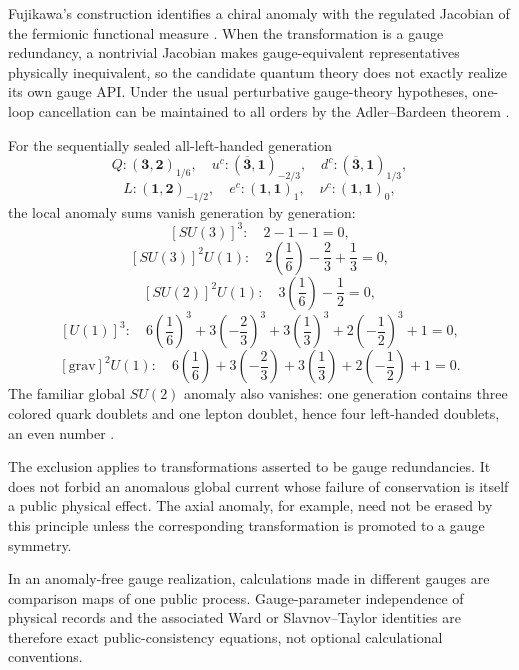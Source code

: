 \begin{proofsketch}
Fujikawa's construction identifies a chiral anomaly with the regulated Jacobian of
the fermionic functional measure \cite{fujikawa-measure}.  When the transformation
is a gauge redundancy, a nontrivial Jacobian makes gauge-equivalent representatives
physically inequivalent, so the candidate quantum theory does not exactly realize
its own gauge API.  Under the usual perturbative gauge-theory hypotheses, one-loop
cancellation can be maintained to all orders by the Adler--Bardeen theorem
\cite{adler-bardeen-anomaly}.
\end{proofsketch}

\begin{proposition}
\label{prop:sm-anomaly-checksum-ledger}
For the sequentially sealed all-left-handed generation
\[
 Q:(\mathbf3,\mathbf2)_{1/6},\quad
 u^c:(\overline{\mathbf3},\mathbf1)_{-2/3},\quad
 d^c:(\overline{\mathbf3},\mathbf1)_{1/3},
\]
\[
 L:(\mathbf1,\mathbf2)_{-1/2},\quad
 e^c:(\mathbf1,\mathbf1)_1,\quad
 \nu^c:(\mathbf1,\mathbf1)_0,
\]
the local anomaly sums vanish generation by generation:
\[
 [SU(3)]^3:\quad 2-1-1=0,
\]
\[
 [SU(3)]^2U(1):\quad
 2\!\left(\frac16\right)-\frac23+\frac13=0,
\]
\[
 [SU(2)]^2U(1):\quad
 3\!\left(\frac16\right)-\frac12=0,
\]
\[
 [U(1)]^3:\quad
 6\!\left(\frac16\right)^3
 +3\!\left(-\frac23\right)^3
 +3\!\left(\frac13\right)^3
 +2\!\left(-\frac12\right)^3+1=0,
\]
\[
 [\mathrm{grav}]^2U(1):\quad
 6\!\left(\frac16\right)
 +3\!\left(-\frac23\right)
 +3\!\left(\frac13\right)
 +2\!\left(-\frac12\right)+1=0.
\]
The familiar global \(SU(2)\) anomaly also vanishes: one generation contains three
colored quark doublets and one lepton doublet, hence four left-handed doublets, an
even number \cite{witten-su2}.
\end{proposition}

\begin{remark}
The exclusion applies to transformations asserted to be gauge redundancies.  It does
not forbid an anomalous global current whose failure of conservation is itself a
public physical effect.  The axial anomaly, for example, need not be erased by this
principle unless the corresponding transformation is promoted to a gauge symmetry.
\end{remark}

\begin{corollary}
In an anomaly-free gauge realization, calculations made in different gauges are
comparison maps of one public process.  Gauge-parameter independence of physical
records and the associated Ward or Slavnov--Taylor identities are therefore exact
public-consistency equations, not optional calculational conventions.
\end{corollary}

